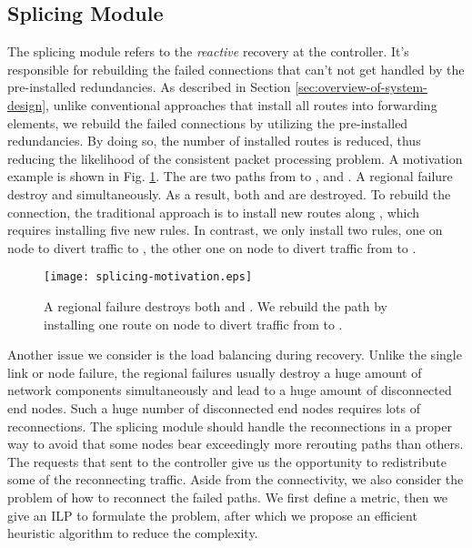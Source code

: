 \documentclass[10pt,journal]{IEEEtran}
\begin{document}
\subsection{Splicing Module}\label{sec:splicing-module}
The splicing module refers to the \emph{reactive} recovery at the controller. It's responsible for rebuilding the failed connections that can't not get handled by the pre-installed redundancies. As described in Section \ref{sec:overview-of-system-design}, unlike conventional approaches that install all routes into forwarding elements, we rebuild the failed connections by utilizing the pre-installed redundancies. By doing so, the number of installed routes is reduced, thus reducing the likelihood of the consistent packet processing problem. A motivation example is shown in Fig. \ref{fig:splicing-motivation}. The are two paths from  to ,  and . A regional failure destroy  and  simultaneously. As a result, both  and  are destroyed. To rebuild the connection, the traditional approach is to install new routes along , which requires installing five new rules. In contrast, we only install two rules, one on node  to divert traffic to , the other one on node  to divert traffic from  to .
\begin{figure}
\centering
		\texttt{[image: splicing-motivation.eps]}
	\caption{A regional failure destroys both  and . We rebuild the path by installing one route on node  to divert traffic from  to .}
	\label{fig:splicing-motivation}
\end{figure}

Another issue we consider is the load balancing during recovery. Unlike the single link or node failure, the regional failures usually destroy a huge amount of network components simultaneously and lead to a huge amount of disconnected end nodes. Such a huge number of disconnected end nodes requires lots of reconnections. The splicing module should handle the reconnections in a proper way to avoid that some nodes bear exceedingly more rerouting paths than others. The requests that sent to the controller give us the opportunity to redistribute some of the reconnecting traffic. Aside from the connectivity, we also consider the problem of how to reconnect the failed paths. We first define a metric, then we give an ILP to formulate the problem, after which we propose an efficient heuristic algorithm to reduce the complexity.
\end{document}
